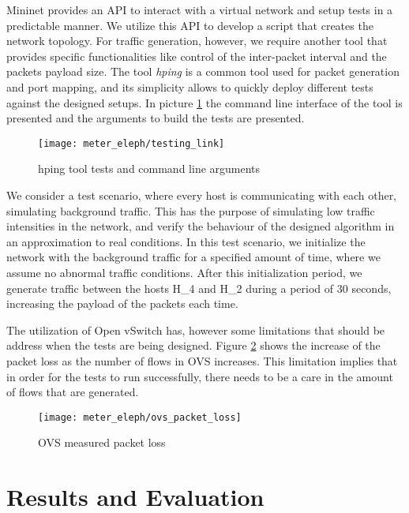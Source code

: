 Mininet provides an API to interact with a virtual network and setup tests in a predictable manner. We utilize this API to develop a script that creates the network
topology. For traffic generation, however, we require another tool that provides specific functionalities like control of the inter-packet interval and the packets 
payload size. The tool \textit{hping} is a common tool used for packet generation and port mapping, and its simplicity allows to quickly deploy different tests
against the designed setups. In picture \ref{fig:hping_setup} the command line interface of the tool is presented and the arguments to build the tests are presented.

\begin{figure}[H]
    \centering
    \texttt{[image: meter\_eleph/testing\_link]}
    \caption{hping tool tests and command line arguments}
    \label{fig:hping_setup}
\end{figure}

\par We consider a test scenario, where every host is communicating with each other, simulating background traffic. This has the purpose of simulating low traffic 
intensities in the network, and verify the behaviour of the designed algorithm in an approximation to real conditions. In this test scenario, we initialize the 
network with the background traffic for a specified amount of time, where we assume no abnormal traffic conditions. After this initialization period, we generate
traffic between the hosts H\_4 and H\_2 during a period of 30 seconds, increasing the payload of the packets each time.

\par The utilization of Open vSwitch has, however some limitations that should be address when the tests are being designed. Figure \ref{fig:ovs_packet_loss} shows
the increase of the packet loss as the number of flows in OVS increases. This limitation implies that in order for the tests to run successfully, there needs to be
a care in the amount of flows that are generated.

\begin{figure} [H]
    \centering
    \texttt{[image: meter\_eleph/ovs\_packet\_loss]}
    \caption {OVS measured packet loss}
    \label{fig:ovs_packet_loss}
\end{figure} 

\section {Results and Evaluation} \label{sec:change_results}

